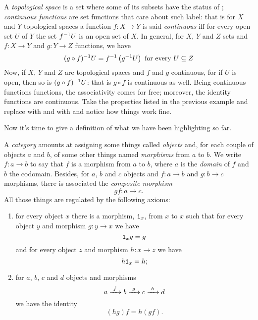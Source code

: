 
\begin{example}[Topology]
A {\em topological space} is a set where some of its subsets have the status of ; {\em continuous functions} are set functions that care about such label: that is for \(X\) and \(Y\) topological spaces a function \(f : X \to Y\) is said {\em continuous} iff for every open set \(U\) of \(Y\) the set \(f^{-1} U\) is an open set of \(X\). In general, for \(X\), \(Y\) and \(Z\) sets and \(f : X \to Y\) and \(g : Y \to Z\) functions, we have
\[(g \circ f)^{-1}U = f^{-1} \left(g^{-1} U\right) \text{ for every } U \subseteq Z\]
Now, if \(X\), \(Y\) and \(Z\) are topological spaces and \(f\) and \(g\) continuous, for if \(U\) is open, then so is \((g \circ f)^{-1}U\): that is \(g \circ f\) is continuous as well. Being continuous functions functions, the associativity comes for free; moreover, the identity functions are continuous. Take the properties listed in the previous example and replace  with  and  with  and notice how things work fine.
\end{example}

Now it's time to give a definition of what we have been highlighting so far. 

\begin{definition}[Categories]
A {\em category} amounts at assigning some things called {\em objects} and, for each couple of objects \(a\) and \(b\), of some other things named {\em morphisms} from \(a\) to \(b\). We write \(f : a \to b\) to say that \(f\) is a morphism from \(a\) to \(b\), where \(a\) is the {\em domain} of \(f\) and \(b\) the codomain. Besides, for \(a\), \(b\) and \(c\) objects and \(f : a \to b\) and \(g : b \to c\) morphisms, there is associated the {\em composite morphism}
\[gf : a \to c .\]
All those things are regulated by the following axioms:
\begin{enumerate}
\item for every object \(x\) there is a morphism, \(\mathtt 1_x\), from \(x\) to \(x\) such that for every object \(y\) and morphism \(g : y \to x\) we have
\[\mathtt 1_x g = g\]
and for every object \(z\) and morphism \(h : x \to z\) we have
\[h \mathtt 1_x = h ;\]
\item for \(a\), \(b\), \(c\) and \(d\) objects and morphisms
\[a \xrightarrow{\ f\ } b \xrightarrow{\ g\ } c \xrightarrow{\ h\ } d\]
we have the identity
\[(h g) f = h (g f) .\]
\end{enumerate}
\end{definition}

